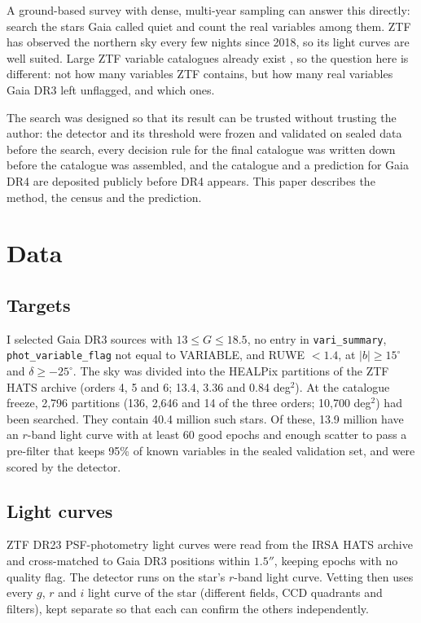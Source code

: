 \documentclass[twocolumn]{searchchev_preprint}
\begin{document}
A ground-based survey with dense, multi-year sampling can answer this directly: search the stars Gaia called quiet
and count the real variables among them. ZTF \citep{Bellm2019,Masci2019} has observed the northern sky every few
nights since 2018, so its light curves are well suited. Large ZTF variable catalogues already exist
\citep{Chen2020,Ofek2020,Healy2024}, so the question here is different: not how many variables ZTF contains, but
how many real variables Gaia DR3 left unflagged, and which ones.

The search was designed so that its result can be trusted without trusting the author: the detector and its threshold
were frozen and validated on sealed data before the search, every decision rule for the final catalogue was written
down before the catalogue was assembled, and the catalogue and a prediction for Gaia DR4 are deposited publicly
before DR4 appears. This paper describes the method, the census and the prediction.

\section{Data}
\subsection{Targets}
I selected Gaia DR3 sources with $13\le G\le18.5$, no entry in \texttt{vari\_summary},
\texttt{phot\_variable\_flag} not equal to VARIABLE, and RUWE $<1.4$, at $|b|\ge15^\circ$ and $\delta\ge-25^\circ$. The
sky was divided into the HEALPix partitions of the ZTF HATS archive (orders 4, 5 and 6; 13.4, 3.36 and 0.84 deg$^2$).
At the catalogue freeze, 2,796 partitions (136, 2,646 and 14 of the three orders; 10,700 deg$^2$) had been searched.
They contain 40.4 million such stars. Of these, 13.9 million have an $r$-band light curve with at least 60 good epochs
and enough scatter to pass a pre-filter that keeps 95\% of known variables in the sealed validation set, and were
scored by the detector.

\subsection{Light curves}
ZTF DR23 PSF-photometry light curves were read from the IRSA HATS archive and cross-matched to Gaia DR3 positions
within $1.5''$, keeping epochs with no quality flag. The detector runs on the star's $r$-band light curve.
Vetting then uses every $g$, $r$ and $i$ light curve of the star (different fields, CCD quadrants and filters), kept
separate so that each can confirm the others independently.
\end{document}
